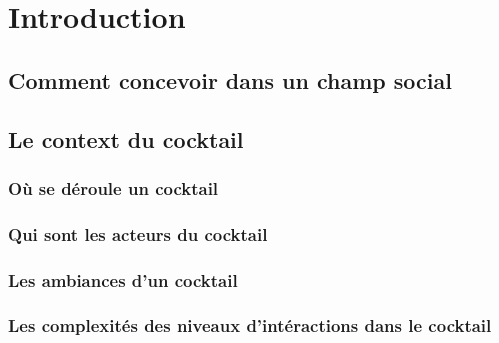 \chapter*{Introduction}

\section{Comment concevoir dans un champ social}

\section{Le context du cocktail}

\subsection{Où se déroule un cocktail}

\subsection{Qui sont les acteurs du cocktail}

\subsection{Les ambiances d'un cocktail}

\subsection{Les complexités des niveaux d'intéractions dans le cocktail}

